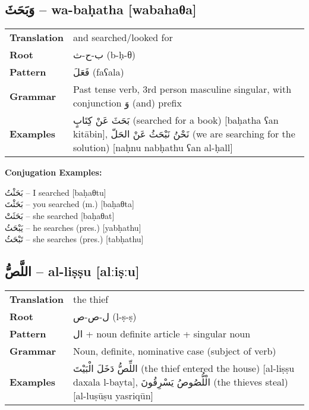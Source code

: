 \documentclass[a4paper,12pt]{article}
\begin{document}
\subsection{\textarabic{وَبَحَثَ} – \textbf{wa-baḥatha} [wabahaθa]}
\begin{tabular}{p{3cm}p{10cm}}
\toprule
\textbf{Translation} & and searched/looked for \\
\textbf{Root} & \textarabic{ب-ح-ث} (b-ḥ-θ) \\
\textbf{Pattern} & \textarabic{فَعَلَ} (faʕala) \\
\textbf{Grammar} & Past tense verb, 3rd person masculine singular, with conjunction \textarabic{وَ} (and) prefix \\
\textbf{Examples} & \textarabic{بَحَثَ عَنْ كِتَابٍ} (searched for a book) [baḥatha ʕan kitābin], \textarabic{نَحْنُ نَبْحَثُ عَنْ الحَلّ} (we are searching for the solution) [naḥnu nabḥathu ʕan al-ḥall] \\
\bottomrule
\end{tabular}

\textbf{Conjugation Examples:}
\begin{multicols}{2}
\small
\textarabic{بَحَثْتُ} – I searched [baḥaθtu] \\
\textarabic{بَحَثْتَ} – you searched (m.) [baḥaθta] \\
\textarabic{بَحَثَتْ} – she searched [baḥaθat] \\
\textarabic{يَبْحَثُ} – he searches (pres.) [yabḥathu] \\
\textarabic{تَبْحَثُ} – she searches (pres.) [tabḥathu]
\end{multicols}

\subsection{\textarabic{اللَّصُّ} – \textbf{al-liṣṣu} [alːiṣːu]}
\begin{tabular}{p{3cm}p{10cm}}
\toprule
\textbf{Translation} & the thief \\
\textbf{Root} & \textarabic{ل-ص-ص} (l-ṣ-ṣ) \\
\textbf{Pattern} & \textarabic{ال} + noun definite article + singular noun \\
\textbf{Grammar} & Noun, definite, nominative case (subject of verb) \\
\textbf{Examples} & \textarabic{اللِّصُّ دَخَلَ الْبَيْتَ} (the thief entered the house) [al-liṣṣu daxala l-bayta], \textarabic{الْلُّصُوصُ يَسْرِقُونَ} (the thieves steal) [al-luṣūṣu yasriqūn] \\
\bottomrule
\end{tabular}
\end{document}
